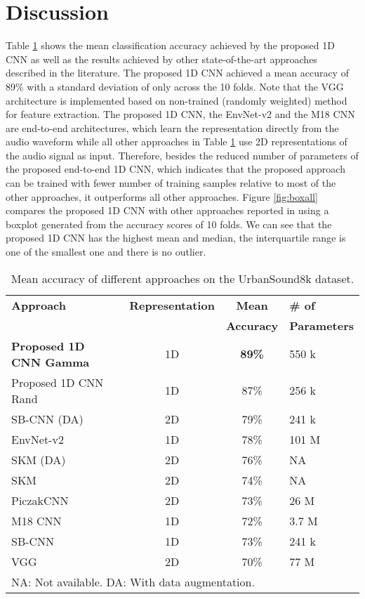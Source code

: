 \documentclass[preprint,final,12pt]{elsarticle}
\begin{document}
\section{Discussion}
\label{sec:dis}


Table \ref{table:meanacc} shows the mean classification accuracy achieved by the proposed 1D CNN as well as the results achieved by other state-of-the-art approaches described in the literature. The proposed 1D CNN achieved a mean accuracy of 89\% with a standard deviation of only  across the 10 folds. Note that the VGG architecture \citep{pons2018randomly} is implemented based on non-trained (randomly weighted) method for feature extraction. The proposed 1D CNN, the EnvNet-v2 \citep{tokozume2017learning} and the M18 CNN \citep{Dai2017} are end-to-end architectures, which learn the representation directly from the audio waveform while all other approaches in Table \ref{table:meanacc} use 2D representations of the audio signal as input. Therefore, besides the reduced number of parameters of the proposed end-to-end 1D CNN, which indicates that the proposed approach can be trained with fewer number of training samples relative to most of the other approaches, it outperforms all other approaches. Figure \ref{fig:boxall} compares the proposed 1D CNN with other approaches reported in \citep{salamon2015unsupervised} using a boxplot generated from the accuracy scores of 10 folds. We can see that the proposed 1D CNN has the highest mean and median, the interquartile range is one of the smallest one and there is no outlier. 

\begin{table}[htpb!]
\caption{Mean accuracy of different approaches on the UrbanSound8k dataset.} \centering \footnotesize
\begin{tabular}{l c c l} \hline\hline \textbf{Approach}& \textbf{Representation} & \textbf{Mean} &\textbf{\# of} \\
 &  & \textbf{Accuracy} &\textbf{Parameters} \\
\hline \textbf{Proposed 1D CNN Gamma}& 1D &\textbf{89\%} & 550 k \\
Proposed 1D CNN Rand & 1D & 87\% & 256 k \\
SB-CNN (DA) \citep{2017deepsalamon}& 2D & 79\% & 241 k\\ EnvNet-v2 \citep{tokozume2017learning}&1D &78\% & 101 M\\
SKM (DA) \citep{salamon2015unsupervised}&2D &76\% & NA\\ SKM \citep{salamon2015unsupervised}&2D &74\% & NA\\
PiczakCNN \citep{piczak2015environmental}&2D &73\% & 26 M\\ M18 CNN \citep{Dai2017}&1D &72\% & 3.7 M\\ SB-CNN \citep{2017deepsalamon}&1D &73\% & 241 k\\
VGG \citep{pons2018randomly}&2D &70\% & 77 M\\ \hline \multicolumn{3}{l}{NA: Not available. DA: With data augmentation.}
\end{tabular}
\label{table:meanacc} \end{table}
\end{document}

